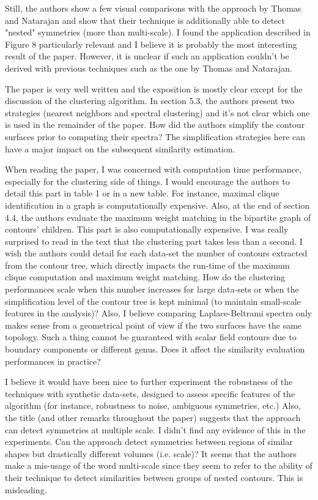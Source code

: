 \documentclass[10pt]{article}
\begin{document}
   Still, the authors show a few visual comparisons with the approach by
   Thomas and Natarajan and show that their technique is additionally able
   to detect "nested" symmetries (more than multi-scale).
   I found the application described in Figure 8 particularly relevant and I
   believe it is probably the most interesting result of the paper. However,
   it is unclear if such an application couldn't be derived with previous
   techniques such as the one by Thomas and Natarajan.

The paper is very well written and the exposition is mostly clear except
   for the discussion of the clustering algorithm. In section 5.3, the
   authors present two strategies (nearest neighbors and spectral
   clustering) and it's not clear which one is used in the remainder of the
   paper.
   How did the authors simplify the contour surfaces prior to computing
   their spectra? The simplification strategies here can have a major impact
   on the subsequent similarity estimation.

   When reading the paper, I was concerned with computation time
   performance, especially for the clustering side of things. I would
   encourage the authors to detail this part in table 1 or in a new table.
   For instance, maximal clique identification in a graph is computationally
   expensive. Also, at the end of section 4.4, the authors evaluate the
   maximum weight matching in the bipartite graph of contours' children.
   This part is also computationally expensive. I was really surprised to
   read in the text that the clustering part takes less than a 
   second. I wish the authors could detail for each data-set the number of 
   contours extracted from the contour tree, which directly impacts the
   run-time of the maximum clique computation and maximum weight matching.
   How do the clustering performances scale when this number increases for
   large data-sets or when the simplification level of the contour tree is
   kept minimal (to maintain small-scale features in the analysis)?
   Also, I believe comparing Laplace-Beltrami spectra only makes sense from
   a geometrical point of view if the two surfaces have the same topology.
   Such a thing cannot be guaranteed with scalar field contours due to
   boundary components or different genus. Does it affect the similarity
   evaluation performances in practice?

   I believe it would have been nice to further experiment the robustness of
   the techniques with synthetic data-sets, designed to assess specific
   features of the algorithm (for instance, robustness to noise, ambiguous
   symmetries, etc.)
   Also, the title (and other remarks throughout the paper) suggests that
   the approach can detect symmetries at multiple scale. I didn't find any
   evidence of this in the experiments. Can the approach detect symmetries
   between regions of similar shapes but drastically different volumes (i.e.
   scale)?
   It seems that the authors make a mis-usage of the word multi-scale since
   they seem to refer to the ability of their technique to detect
   similarities between groups of nested contours. This is misleading.
\end{document}
